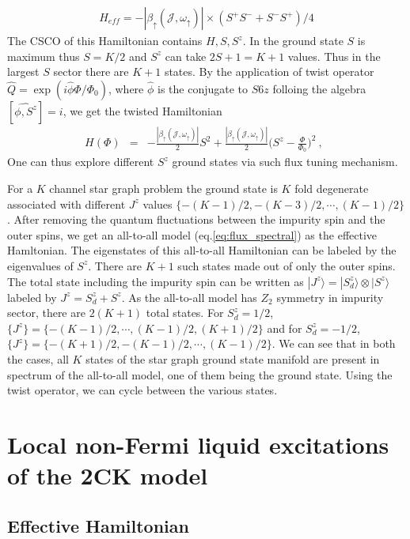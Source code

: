 \documentclass[reprint,prb,superscriptaddress]{revtex4-2}
\begin{document}
\begin{eqnarray}
H_{eff}   =-|\beta_{\uparrow}({\mathcal{J}},\omega_{\uparrow})| \times(S^+S^{-}+ S^-S^{+}) /4   
\end{eqnarray}
\noindent The CSCO of this Hamiltonian contains $H,S,S^z$. In the ground state $S$ is maximum thus $S=K/2$ and $S^z$ can take $2S+1=K+1$ values. Thus in the largest $S$ sector there are $K+1$ states. By the application of twist operator $\hat{Q}=\exp(i\hat{\phi}\Phi/\Phi_0)$, where $\hat{\phi}$ is the conjugate to $S6z$ folloing the algebra $[\hat{\phi,S^z}]=i$, we get the twisted Hamiltonian 
\begin{eqnarray}
H(\Phi) &=& -\frac{|\beta_{\uparrow}({\mathcal{J}},\omega_{\uparrow})|}{2} S^2   +\frac{|\beta_{\uparrow}({\mathcal{J}},\omega_{\uparrow})|}{2} \bigg(S^{z}-\frac{\Phi}{\Phi_0} \bigg)^2 ~,~~
\label{eq:flux_spectral}
\end{eqnarray}
One can thus explore different $S^z$ ground states via such flux tuning mechanism.

For a $K$ channel star graph problem the ground state is $K$ fold degenerate associated with different $J^z$ values $\{-(K-1)/2,-(K-3)/2,\cdots  ,(K-1)/2 \}$. After removing the quantum fluctuations between the impurity spin and the outer spins, we get an all-to-all model (eq.\eqref{eq:flux_spectral}) as the effective Hamltonian. The eigenstates of this all-to-all Hamiltonian can be labeled by the eigenvalues of $S^z$. There are $K+1$ such states made out of only the outer spins. The total state including the impurity spin can be written as $|J^z\rangle = |S_d^z\rangle \otimes |S^z\rangle$ labeled by $J^z=S_d^z+S^z$. As the all-to-all model has $Z_2$ symmetry in impurity sector, there are $2(K+1)$ total states. For $S_d^z=1/2$, $ \{J^z\}=\{ -(K-1)/2, \cdots, (K-1)/2, (K+1)/2 \}$ and for $S_d^z=-1/2$, $\{J^z\}=\{-(K+1)/2, -(K-1)/2, \cdots,  (K-1)/2  \}$. We can see that in both the cases, all $K$ states of the star graph ground state manifold are present in spectrum of the all-to-all model, one of them being the ground state. Using the twist operator, we can cycle between the various states.

\section{Local non-Fermi liquid excitations of the 2CK model}
\label{sec:excitations}
\subsection{Effective Hamiltonian}
\end{document}
